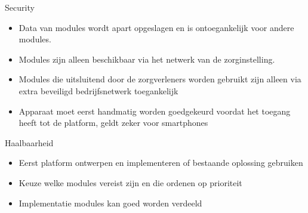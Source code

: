 \documentclass{beamer}
\begin{document}
\begin{frame}{Security}

\begin{itemize}
  \item Data van modules wordt apart opgeslagen en is ontoegankelijk
voor andere modules.
  \item Modules zijn alleen beschikbaar via het netwerk van de
zorginstelling.
  \item Modules die uitsluitend door de zorgverleners worden gebruikt zijn
alleen via extra beveiligd bedrijfsnetwerk toegankelijk
  \item Apparaat moet eerst handmatig worden goedgekeurd voordat het
toegang heeft tot de platform, geldt zeker voor smartphones

\end{itemize}

\vskip 1cm

\end{frame}

\begin{frame}{Haalbaarheid}

\begin{itemize}
  \item Eerst platform ontwerpen en implementeren of bestaande
oplossing gebruiken
  \item Keuze welke modules vereist zijn en die ordenen op prioriteit
  \item Implementatie modules kan goed worden verdeeld

\end{itemize}

\vskip 1cm

\end{frame}
\end{document}
